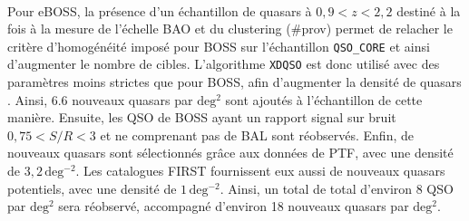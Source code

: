\documentclass[11pt, twoside, a4paper, openright]{report}
\begin{document}


\paragraph{} Pour eBOSS, la présence d'un échantillon de quasars à $0,9 < z < 2,2$ destiné à la fois à la mesure de l'échelle BAO et du clustering (\#prov) permet de relacher le critère d'homogénéité imposé pour BOSS sur l'échantillon \texttt{QSO\_CORE} et ainsi d'augmenter le nombre de cibles.
L'algorithme \texttt{XDQSO} est donc utilisé avec des paramètres moins strictes que pour BOSS, afin d'augmenter la densité de quasars \lya{}.
Ainsi, \num{6,6} nouveaux quasars par $\mathrm{deg^{2}}$ sont ajoutés à l'échantillon de cette manière.
Ensuite, les QSO de BOSS ayant un rapport signal sur bruit $0,75 < S/R < 3$ et ne comprenant pas de BAL sont réobservés.
Enfin, de nouveaux quasars sont sélectionnés gr\^ace aux données de PTF, avec une densité de $3,2\,\mathrm{deg^{-2}}$. Les catalogues FIRST fournissent eux aussi de nouveaux quasars potentiels, avec une densité de $1\,\mathrm{deg^{-2}}$.
Ainsi, un total de total d'environ 8 QSO par $\mathrm{deg^{2}}$ sera réobservé, accompagné d'environ 18 nouveaux quasars par $\mathrm{deg^{2}}$.


\end{document}
